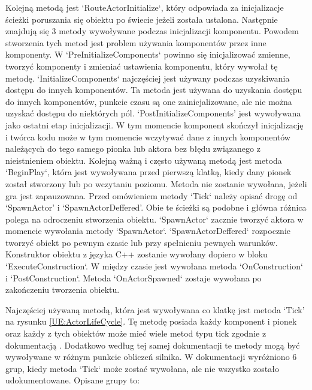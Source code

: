 \documentclass[12pt,twoside]{article}
\begin{document}
Kolejną metodą jest `RouteActorInitialize`, który odpowiada za inicjalizacje
ścieżki poruszania się obiektu po świecie jeżeli została ustalona. Następnie
znajdują się 3 metody wywoływane podczas inicjalizacji komponentu. Powodem
stworzenia tych metod jest problem używania komponentów przez inne komponenty. W
`PreInitializeComponents` powinno się inicjalizować zmienne, tworzyć komponenty
i zmieniać ustawienia komponentu, który wywołał tę metodę.
`InitializeComponents` najczęściej jest używany podczas uzyskiwania dostępu do
innych komponentów. Ta metoda jest używana do uzyskania dostępu do innych
komponentów, punkcie czasu są one zainicjalizowane, ale nie można uzyskać
dostępu do niektórych pól. ‘PostInitializeComponents’ jest wywoływana jako
ostatni etap inicjalizacji. W tym momencie komponent skończył inicjalizację i
twórca kodu może w tym momencie wczytywać dane z innych komponentów należących
do tego samego pionka lub aktora bez błędu związanego z nieistnieniem obiektu.
Kolejną ważną i często używaną metodą jest metoda `BeginPlay`, która jest
wywoływana przed pierwszą klatką, kiedy dany pionek został stworzony lub po
wczytaniu poziomu. Metoda nie zostanie wywołana, jeżeli gra jest zapauzowana.
Przed omówieniem metody `Tick` należy opisać drogę od ‘SpawnActor’ i
‘SpawnActorDeffered’. Obie te ścieżki są podobne i główna różnica polega na
odroczeniu stworzenia obiektu. `SpawnActor` zacznie tworzyć aktora w momencie
wywołania metody `SpawnActor`. `SpawnActorDeffered` rozpocznie tworzyć obiekt po
pewnym czasie lub przy spełnieniu pewnych warunków. Konstruktor obiektu z języka
C++ zostanie wywołany dopiero w bloku `ExecuteConstruction`. W między czasie
jest wywołana metoda `OnConstruction` i `PostConstruction`. Metoda
`OnActorSpawned` zostaje wywołana po zakończeniu tworzenia obiektu. 

Najczęściej używaną metodą, która jest wywoływana co klatkę jest metoda ‘Tick’
na rysunku \ref{UE:ActorLifeCycle}. Tę metodę posiada każdy komponent i pionek
oraz każdy z tych obiektów może mieć wiele metod typu tick zgodnie z
dokumentacją \cite{UE:TickingActor}. Dodatkowo według tej samej dokumentacji te
metody mogą być wywoływane w różnym punkcie obliczeń silnika. W dokumentacji
wyróżniono 6 grup, kiedy metoda `Tick` może zostać wywołana, ale nie wszystko
zostało udokumentowane. Opisane grupy to:
\end{document}

